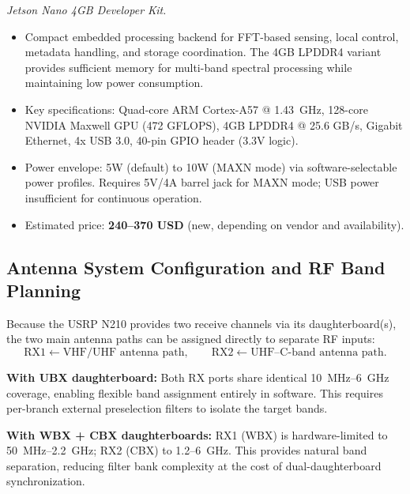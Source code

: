 \documentclass[11pt,a4paper]{article}
\newcommand{\blue}[1]{\textcolor{priceblue}{\textbf{#1}}}
\begin{document}
	\noindent
	\textit{Jetson Nano 4GB Developer Kit.}
	\begin{itemize}
		\item Compact embedded processing backend for FFT-based sensing, local control,
		metadata handling, and storage coordination. The 4GB LPDDR4 variant provides
		sufficient memory for multi-band spectral processing while maintaining low
		power consumption.
		\item Key specifications: Quad-core ARM Cortex-A57 @ 1.43~GHz, 128-core
		NVIDIA Maxwell GPU (472 GFLOPS), 4GB LPDDR4 @ 25.6 GB/s, Gigabit Ethernet,
		4x USB 3.0, 40-pin GPIO header (3.3V logic).
		\item Power envelope: 5W (default) to 10W (MAXN mode) via software-selectable
		power profiles. Requires 5V/4A barrel jack for MAXN mode; USB power
		insufficient for continuous operation.
		\item Estimated price: \blue{240--370 USD} (new, depending on vendor and
		availability).
	\end{itemize}
	
	\subsection*{Antenna System Configuration and RF Band Planning}
	
	Because the USRP N210 provides two receive channels via its daughterboard(s),
	the two main antenna paths can be assigned directly to separate RF inputs:
	\[
	\text{RX1} \leftarrow \text{VHF/UHF antenna path},
	\qquad
	\text{RX2} \leftarrow \text{UHF--C-band antenna path}.
	\]
	
	\textbf{With UBX daughterboard:} Both RX ports share identical 10~MHz--6~GHz
	coverage, enabling flexible band assignment entirely in software. This requires
	per-branch external preselection filters to isolate the target bands.
	
	\textbf{With WBX + CBX daughterboards:} RX1 (WBX) is hardware-limited to
	50~MHz--2.2~GHz; RX2 (CBX) to 1.2--6~GHz. This provides natural band
	separation, reducing filter bank complexity at the cost of dual-daughterboard
	synchronization.
	
	\begin{center}
	\end{center}
	
\end{document}
